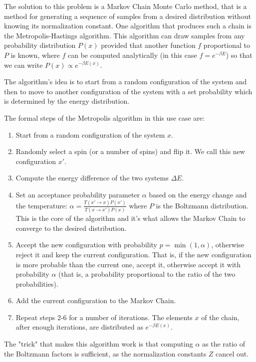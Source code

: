 \br

The solution to this problem is a Markov Chain Monte Carlo method, that is a method for generating a sequence of samples from a desired distribution without knowing its normalization constant. One algorithm that produces such a chain is the Metropolis-Hastings algorithm. This algorithm can draw samples from any probability distribution $P(x)$ provided that another function $f$ proportional to $P$ is known, where $f$ can be computed analytically (in this case $f = e^{-\beta E}$) so that we can write $P(x) \propto e^{-\beta E(x)}$.

The algorithm's idea is to start from a random configuration of the system and then to move to another configuration of the system with a set probability which is determined by the energy distribution.

The formal steps of the Metropolis algorithm in this use case are:

\begin{enumerate}
	\item Start from a random configuration of the system $x$.
	\item Randomly select a spin (or a number of spins) and flip it. We call this new configuration $x'$.
	\item Compute the energy difference of the two systems $\Delta E$.
	\item Set an acceptance probability parameter $\alpha$ based on the energy change and the temperature: $\alpha = \frac{T(x' \to x) P(x')}{T(x \to x') P(x)}$ where $P$ is the Boltzmann distribution. This is the core of the algorithm and it's what allows the Markov Chain to converge to the desired distribution.
	\item Accept the new configuration with probability $p = \min{\left(1, \alpha \right)}$, otherwise reject it and keep the current configuration. That is, if the new configuration is more probable than the current one, accept it, otherwise accept it with probability $\alpha$ (that is, a probability proportional to the ratio of the two probabilities).
	\item Add the current configuration to the Markov Chain.
	\item Repeat steps 2-6 for a number of iterations. The elements $x$ of the chain, after enough iterations, are distributed as $e^{-\beta E(x)}$.
\end{enumerate}

The "trick" that makes this algorithm work is that computing $\alpha$ as the ratio of the Boltzmann factors is sufficient, as the normalization constants $Z$ cancel out.

